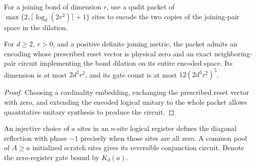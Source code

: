 \begin{definition}
    \label{def:mpu_bond_dilation_packet}
    \leanok
    For a joining bond of dimension $r$, use a qudit packet of
    $\max\{2,\lceil\log_d(2r^2)\rceil+1\}$ sites to encode the two
    copies of the joining-pair space in the dilation.
\end{definition}

\begin{lemma}
    \label{thm:mpu_bond_dilation_packet}
    \leanok
    For $d\geq2$, $r>0$, and a positive definite joining metric,
    the packet admits an encoding whose prescribed reset vector is
    physical zero and an exact neighboring-pair circuit implementing
    the bond dilation on its entire encoded space. Its dimension is
    at most $2d^3r^2$, and its gate count is at most
    $12(2d^3r^2)^5$.
\end{lemma}
\begin{proof}\leanok
    Choosing a cardinality embedding, exchanging the prescribed reset
    vector with zero, and extending the encoded logical unitary to the
    whole packet allows quantitative unitary synthesis to produce the circuit.
\end{proof}

\begin{definition}
    \label{def:mpu_selected_flag_reflection}
    \leanok
    An injective choice of $a$ sites in an $n$-site logical register
    defines the diagonal reflection with phase $-1$ precisely when
    those sites are all zero. A common pool of $A\geq a$ initialized
    scratch sites gives its reversible conjunction circuit.
    Denote the zero-register gate bound by $K_d(a)$.
\end{definition}

